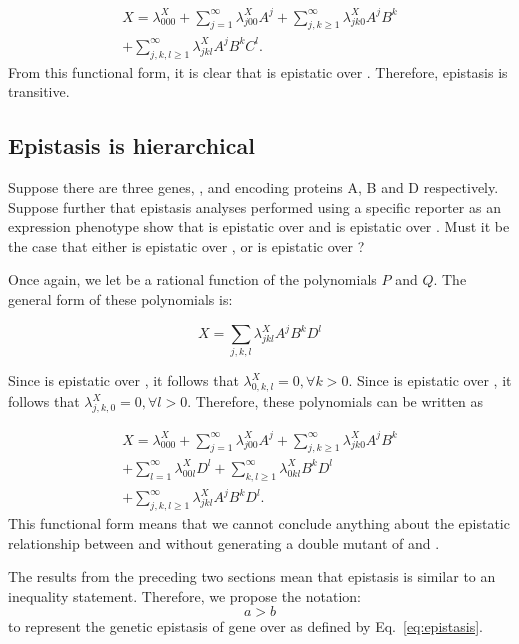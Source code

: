 \begin{multline}
  X =
  \lambda^X_{000}
  +
  \sum_{j=1}^\infty \lambda^X_{j00} A^j
  +
  \sum_{j, k \geq 1}^\infty \lambda^X_{jk0} A^j B^k\\
  +
  \sum_{j, k, l \geq 1}^\infty \lambda^X_{jkl} A^j B^k C^l.
\end{multline}
From this functional form, it is clear that  is epistatic over .
Therefore, epistasis is transitive.

\subsection{Epistasis is hierarchical}
Suppose there are three genes, ,  and  encoding proteins
A, B and D respectively. Suppose further that epistasis analyses performed using
a specific reporter as an expression phenotype show that  is epistatic
over  and  is epistatic over . Must it be the case that
either  is epistatic over , or  is epistatic over
?

Once again, we let \Freg{} be a rational function of the polynomials \(P\) and
\(Q\). The general form of these polynomials is:

\begin{equation*}
    X = \sum_{j, k, l} \lambda^X_{jkl} A^j B^k D^l
\end{equation*}

Since  is epistatic over , it follows that
\(\lambda^X_{0, k, l} = 0,\forall k > 0\). Since  is epistatic over ,
it follows that \(\lambda^X_{j, k, 0} = 0, \forall l>0\). Therefore, these
polynomials can be written as

\begin{multline}
  X =
  \lambda^X_{000}
  +
  \sum_{j = 1}^\infty \lambda^X_{j00} A^j
  +
  \sum_{j, k \geq 1}^\infty \lambda^X_{jk0} A^j B^k\\
  +
  \sum_{l = 1}^\infty \lambda^X_{00l} D^l
  +
  \sum_{k, l \geq 1}^\infty \lambda^X_{0kl} B^k D^l\\
  +
  \sum_{j, k, l \geq 1}^\infty \lambda^X_{jkl} A^j B^k D^l.
\label{eq:abd}
\end{multline}
This functional form means that we cannot conclude anything about the epistatic
relationship between  and  without generating a double mutant of
 and .

The results from the preceding two sections mean that epistasis is similar to
an inequality statement. Therefore, we propose the notation:
\begin{equation}
  a > b
\end{equation}
to represent the genetic epistasis of gene  over  as defined by
Eq.~\ref{eq:epistasis}.

